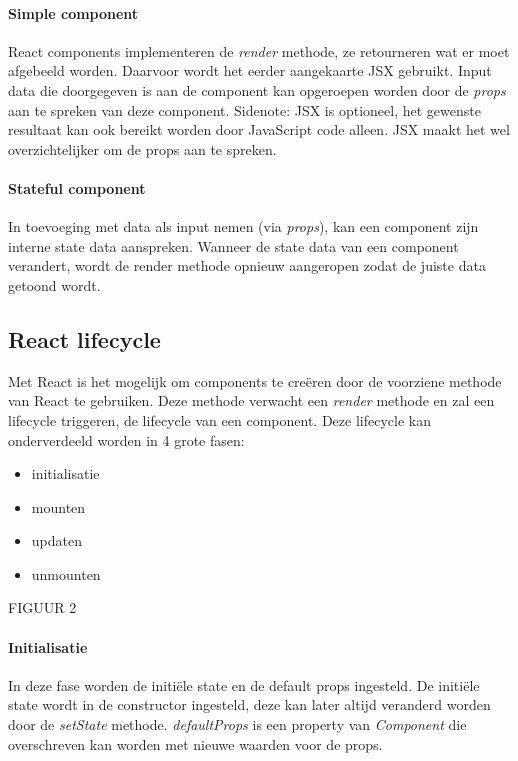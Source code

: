 \paragraph{Simple component}
React components implementeren de \textit{render} methode, ze retourneren wat er moet afgebeeld worden. Daarvoor wordt het eerder aangekaarte JSX gebruikt. Input data die doorgegeven is aan de component kan opgeroepen worden door de \textit{props} aan te spreken van deze component. Sidenote: JSX is optioneel, het gewenste resultaat kan ook bereikt worden door JavaScript code alleen. JSX maakt het wel overzichtelijker om de props aan te spreken.  
\autocite{React01}

\paragraph{Stateful component}
In toevoeging met data als input nemen (via \textit{props}), kan een component zijn interne state data aanspreken. Wanneer de state data van een component verandert, wordt de render methode opnieuw aangeropen zodat de juiste data getoond wordt.
\autocite{React01}


\subsection{React lifecycle}
Met React is het mogelijk om components te creëren door de voorziene methode van React te gebruiken. Deze methode verwacht een \textit{render} methode en zal een lifecycle triggeren, de lifecycle van een component. 
Deze lifecycle kan onderverdeeld worden in 4 grote fasen:
\begin{itemize}
	\item initialisatie
	\item mounten
	\item updaten
	\item unmounten
\end{itemize}

FIGUUR 2

\paragraph{Initialisatie}
In deze fase worden de initiële state en de default props ingesteld. De initiële state wordt in de constructor ingesteld, deze kan later altijd veranderd worden door de \textit{setState} methode. \textit{defaultProps} is een property van \textit{Component} die overschreven kan worden met nieuwe waarden voor de props. 

